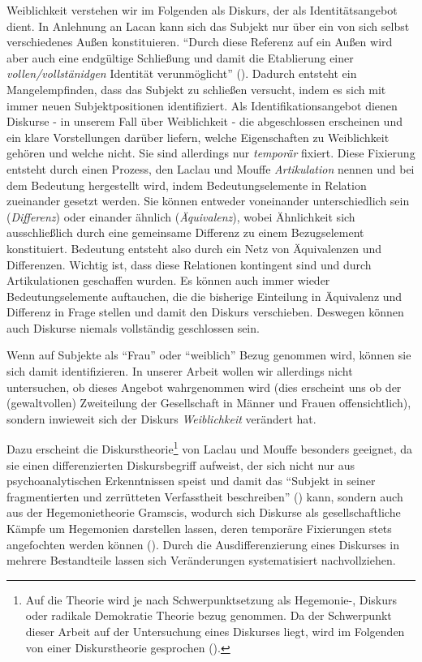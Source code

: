 \documentclass[12pt, titlepage=true, toc=bib]{scrartcl}
\begin{document}
Weiblichkeit verstehen wir im Folgenden als Diskurs, der als Identitätsangebot dient. In Anlehnung an Lacan kann sich das Subjekt nur über ein von sich selbst verschiedenes Außen konstituieren. "`Durch diese Referenz auf ein Außen wird aber auch eine endgültige Schließung und damit die Etablierung einer \textit{vollen/vollstänidgen} Identität verunmöglicht"' (\cite[199; Hervorh. im Orig.]{nonhoff_kollektive_2007}). Dadurch entsteht ein Mangelempfinden, dass das Subjekt zu schließen versucht, indem es sich mit immer neuen Subjektpositionen identifiziert. Als Identifikationsangebot dienen Diskurse - in unserem Fall über Weiblichkeit - die abgeschlossen erscheinen und ein klare Vorstellungen darüber liefern, welche Eigenschaften zu Weiblichkeit gehören und welche nicht. Sie sind allerdings nur \textit{temporär} fixiert. Diese Fixierung entsteht durch einen Prozess, den Laclau und Mouffe \textit{Artikulation} nennen und bei dem Bedeutung hergestellt wird, indem Bedeutungselemente in Relation zueinander gesetzt werden. Sie können entweder voneinander unterschiedlich sein (\textit{Differenz}) oder einander ähnlich (\textit{Äquivalenz}), wobei Ähnlichkeit sich ausschließlich durch eine gemeinsame Differenz zu einem Bezugselement konstituiert. Bedeutung entsteht also durch ein Netz von Äquivalenzen und Differenzen. Wichtig ist, dass diese Relationen kontingent sind und durch Artikulationen geschaffen wurden. Es können auch immer wieder Bedeutungselemente auftauchen, die die bisherige Einteilung in Äquivalenz und Differenz in Frage stellen und damit den Diskurs verschieben. Deswegen können auch Diskurse niemals vollständig geschlossen sein. 


Wenn auf Subjekte als "`Frau"' oder "`weiblich"' Bezug genommen wird, können sie sich damit identifizieren. In unserer Arbeit wollen wir allerdings nicht untersuchen, ob dieses Angebot wahrgenommen wird (dies erscheint uns ob der (gewaltvollen) Zweiteilung der Gesellschaft in Männer und Frauen offensichtlich), sondern inwieweit sich der Diskurs \textit{Weiblichkeit} verändert hat. 

Dazu erscheint die Diskurstheorie\footnote{Auf die Theorie wird je nach Schwerpunktsetzung als Hegemonie-, Diskurs oder radikale Demokratie Theorie bezug genommen. Da der Schwerpunkt dieser Arbeit auf der Untersuchung eines Diskurses liegt, wird im Folgenden von einer Diskurstheorie gesprochen (\cite[vgl.][]{nonhoff_diskurs_2007-1}).} von Laclau und Mouffe besonders geeignet, da sie einen differenzierten Diskursbegriff aufweist, der sich nicht nur aus psychoanalytischen Erkenntnissen speist und damit das "`Subjekt in seiner fragmentierten und zerrütteten Verfasstheit beschreiben"' (\cite[198]{nonhoff_kollektive_2007}) kann, sondern auch aus der Hegemonietheorie Gramscis, wodurch sich Diskurse als gesellschaftliche Kämpfe um Hegemonien darstellen lassen, deren temporäre Fixierungen stets angefochten werden können (\cite[vgl.][8-9]{nonhoff_diskurs_2007-1}). Durch die Ausdifferenzierung eines Diskurses in mehrere Bestandteile lassen sich Veränderungen systematisiert nachvollziehen.
\end{document}
